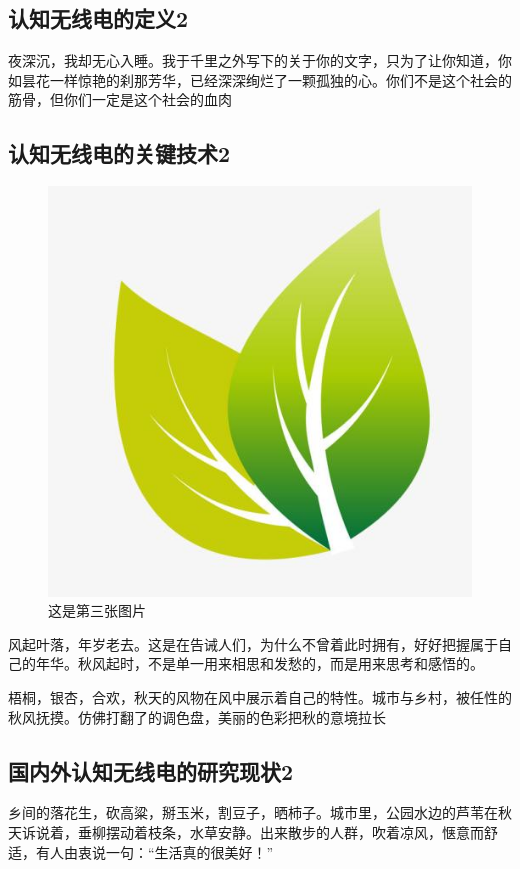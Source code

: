 \subsection{认知无线电的定义2}
夜深沉，我却无心入睡。我于千里之外写下的关于你的文字，只为了让你知道，你如昙花一样惊艳的刹那芳华，已经深深绚烂了一颗孤独的心。你们不是这个社会的筋骨，但你们一定是这个社会的血肉
\subsection{认知无线电的关键技术2}
\begin{figure}
    \centering
    \caption{这是第三张图片}
    \includegraphics[scale=0.4]{pics/123.jpg}
\end{figure}
风起叶落，年岁老去。这是在告诫人们，为什么不曾着此时拥有，好好把握属于自己的年华。秋风起时，不是单一用来相思和发愁的，而是用来思考和感悟的。



梧桐，银杏，合欢，秋天的风物在风中展示着自己的特性。城市与乡村，被任性的秋风抚摸。仿佛打翻了的调色盘，美丽的色彩把秋的意境拉长
\subsection{国内外认知无线电的研究现状2}
乡间的落花生，砍高粱，掰玉米，割豆子，晒柿子。城市里，公园水边的芦苇在秋天诉说着，垂柳摆动着枝条，水草安静。出来散步的人群，吹着凉风，惬意而舒适，有人由衷说一句：“生活真的很美好！”



